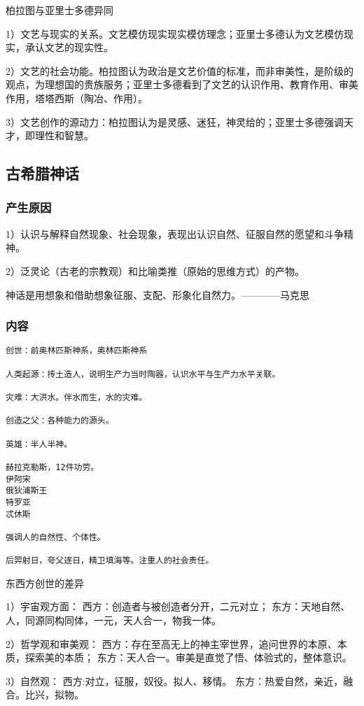 \documentclass[UTF8]{../../RepresentationUniverse}
\begin{document}
\begin{proposition}
    柏拉图与亚里士多德异同

    1）文艺与现实的关系。文艺模仿现实现实模仿理念；亚里士多德认为文艺模仿现实，承认文艺的现实性。
    
    2）文艺的社会功能。柏拉图认为政治是文艺价值的标准，而非审美性，是阶级的观点，为理想国的贵族服务；亚里士多德看到了文艺的认识作用、教育作用、审美作用，塔塔西斯（陶冶、作用）。
    
    3）文艺创作的源动力：柏拉图认为是灵感、迷狂，神灵给的；亚里士多德强调天才，即理性和智慧。
\end{proposition}



\subsection{古希腊神话}

\subsubsection{产生原因}

1）认识与解释自然现象、社会现象，表现出认识自然、征服自然的愿望和斗争精神。

2）泛灵论（古老的宗教观）和比喻类推（原始的思维方式）的产物。

神话是用想象和借助想象征服、支配、形象化自然力。————马克思


\subsubsection{内容}

\begin{lstlisting}
创世：前奥林匹斯神系，奥林匹斯神系

人类起源：抟土造人，说明生产力当时陶器，认识水平与生产力水平关联。

灾难：大洪水。伴水而生，水的灾难。

创造之父：各种能力的源头。

英雄：半人半神。

赫拉克勒斯，12件功劳。
伊阿宋
俄狄浦斯王
特罗亚
忒休斯

强调人的自然性、个体性。

后羿射日，夸父逐日，精卫填海等。注重人的社会责任。
\end{lstlisting}


\begin{proposition}
    东西方创世的差异

    1）宇宙观方面：
    西方：创造者与被创造者分开，二元对立；
    东方：天地自然、人，同源同构同体，一元，天人合一，物我一体。

    2）哲学观和审美观：
    西方：存在至高无上的神主宰世界，追问世界的本原、本质，探索美的本质；
    东方：天人合一。审美是直觉了悟、体验式的，整体意识。

    3）自然观：
    西方:对立，征服，奴役。拟人、移情。
    东方：热爱自然，亲近，融合。比兴，拟物。
\end{proposition}
\end{document}
